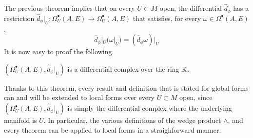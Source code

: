 The previous theorem implies that on every $U \subset M$ open, the differential $\hat d_\phi$ has a restriction $\hat d_\phi|_U: \Omega_U^\bullet(A, E) \to \Omega_U^\bullet(A, E)$ that satisfies, for every $\omega \in \Omega^\bullet(A, E)$, 
    \begin{equation} \label{equationRestrictionOfDifferentialLocalOperatorGoodRestriction}
        \hat d_\phi|_U( \omega|_U) = (\hat d_\phi \omega)|_U
    \end{equation} 
It is now easy to proof the following.


\begin{theorem}
$(\Omega_U^\bullet(A, E), \hat d_\phi|_U)$ is a differential complex over the ring $\mathbb{K}$.
\end{theorem}

\begin{remark}
Thanks to this theorem, every result and definition that is stated for global forms can and will be extended to local forms over every $U \subset M$ open, since $(\Omega_U^\bullet(A, E), \hat d_\phi|_U)$ is simply the differential complex where the underlying manifold is $U$. In particular, the various definitions of the wedge product $\wedge$, and every theorem can be applied to local forms in a straighforward manner.
\end{remark}

\lin

